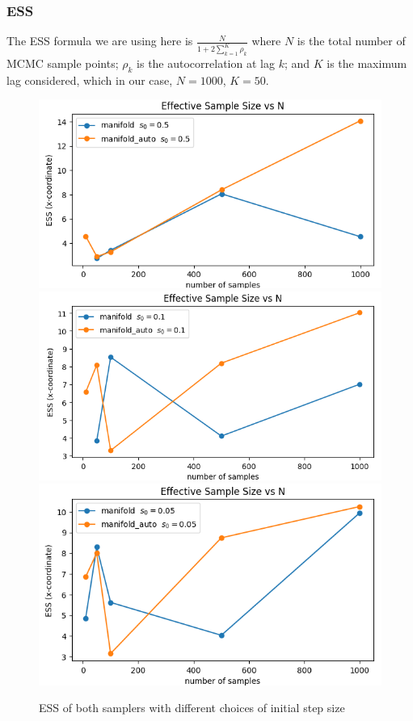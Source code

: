 \documentclass{article}
\begin{document}
\subsubsection{ESS}
The ESS formula we are using here is $\frac{N}{1+ 2\sum_{k=1}^K \rho_k}$ where $N$ is the total number of MCMC sample points; $\rho_k$ is the autocorrelation at lag $k$; and $K$ is the maximum lag considered, which in our case, $N = 1000$, $K=50$.
\begin{figure}[H]
    \centering
    \begin{adjustbox}{width=\textwidth}
      \includegraphics[height=0.06\textheight]{ess_bad_s.png}
      \hspace{1em}
      \includegraphics[height=0.06\textheight]{ess_margin.png}
      \hspace{1em}
      \includegraphics[height=0.06\textheight]{ess_good_s.png}
    \end{adjustbox}
    \caption{ESS of both samplers with different choices of initial step size}
    \label{fig:ess}
\end{figure}
\end{document}
